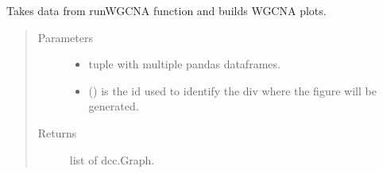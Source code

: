 \documentclass[letterpaper,10pt,english]{sphinxmanual}
\begin{document}
\begin{fulllineitems}
\label{\detokenize{_autosummary/analytics_core.viz:analytics_core.viz.viz.get_WGCNAPlots}}
Takes data from runWGCNA function and builds WGCNA plots.
\begin{quote}\begin{description}
\item[{Parameters}] \leavevmode\begin{itemize}
\item {} 
 \textendash{} tuple with multiple pandas dataframes.

\item {} 
 () \textendash{} is the id used to identify the div where the figure will be generated.

\end{itemize}

\item[{Returns}] \leavevmode
list of dcc.Graph.

\end{description}\end{quote}

\end{fulllineitems}

\end{document}

